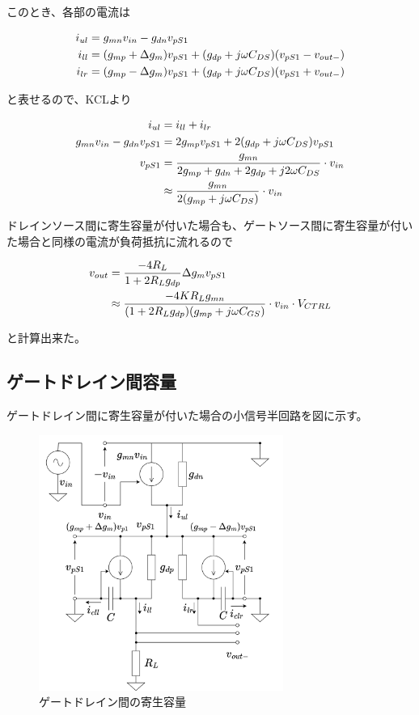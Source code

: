\documentclass[twocolumn]{jsarticle}
\begin{document}
    このとき、各部の電流は

    \begin{align}
        i_{ul} &= g_{mn}v_{in}-g_{dn}v_{pS1}    \notag\\
        i_{ll} &= (g_{mp}+\Delta g_{m})v_{pS1}+(g_{dp}+j\omega C_{DS})(v_{pS1}-v_{out-})     \notag\\
        i_{lr} &= (g_{mp}-\Delta g_{m})v_{pS1}+(g_{dp}+j\omega C_{DS})(v_{pS1}+v_{out-})     \notag
    \end{align}

    と表せるので、KCLより

    \begin{align}
        i_{ul}&=i_{ll}+i_{lr}   \notag\\
        g_{mn}v_{in}-g_{dn}v_{pS1} &= 2g_{mp}v_{pS1}+2(g_{dp}+j\omega C_{DS})v_{pS1}     \notag\\
        v_{pS1}&=\frac{g_{mn}}{2g_{mp}+g_{dn}+2g_{dp}+j2\omega C_{DS}}\cdot v_{in}      \notag\\
        &\approx \frac{g_{mn}}{2(g_{mp}+j\omega C_{DS})}\cdot v_{in}    \label{eq:vps_ds}
    \end{align}

    ドレインソース間に寄生容量が付いた場合も、ゲートソース間に寄生容量が付いた場合と同様の電流が負荷抵抗に流れるので

    \begin{align}
        v_{out}&=\frac{-4R_{L}}{1+2R_{L}g_{dp}}\Delta g_{m}v_{pS1}      \notag\\
        &\approx\frac{-4KR_{L}g_{mn}}{(1+2R_{L}g_{dp})(g_{mp}+j\omega C_{GS})}\cdot v_{in}\cdot V_{CTRL}    \label{eq:vout_ds}
    \end{align}

    と計算出来た。\newpage

    \subsection{ゲートドレイン間容量}
    ゲートドレイン間に寄生容量が付いた場合の小信号半回路を図に示す。

    \begin{figure}[b]
        \begin{center}
            \includegraphics*[width=80mm]{figures/FoldedGilbert_GD_Half_Equivalent.png}
            \caption{ゲートドレイン間の寄生容量}
            \label{fig:cgd}
        \end{center}
    \end{figure}

    
\end{document}
